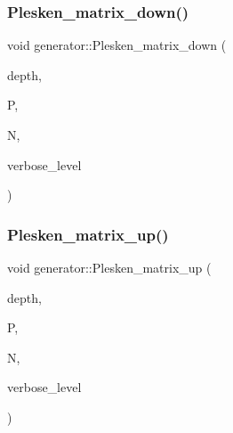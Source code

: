 \subsubsection{\texorpdfstring{Plesken\+\_\+matrix\+\_\+down()}{Plesken\_matrix\_down()}}
{\footnotesize\ttfamily void generator\+::\+Plesken\+\_\+matrix\+\_\+down (\begin{DoxyParamCaption}\item[{\mbox{\hyperlink{galois_8h_a09fddde158a3a20bd2dcadb609de11dc}{I\+NT}}}]{depth,  }\item[{\mbox{\hyperlink{galois_8h_a09fddde158a3a20bd2dcadb609de11dc}{I\+NT}} $\ast$\&}]{P,  }\item[{\mbox{\hyperlink{galois_8h_a09fddde158a3a20bd2dcadb609de11dc}{I\+NT}} \&}]{N,  }\item[{\mbox{\hyperlink{galois_8h_a09fddde158a3a20bd2dcadb609de11dc}{I\+NT}}}]{verbose\+\_\+level }\end{DoxyParamCaption})}

\mbox{\label{classgenerator_a5944c65399c201b426ea3ab2eb7cfa6e}} 
\subsubsection{\texorpdfstring{Plesken\+\_\+matrix\+\_\+up()}{Plesken\_matrix\_up()}}
{\footnotesize\ttfamily void generator\+::\+Plesken\+\_\+matrix\+\_\+up (\begin{DoxyParamCaption}\item[{\mbox{\hyperlink{galois_8h_a09fddde158a3a20bd2dcadb609de11dc}{I\+NT}}}]{depth,  }\item[{\mbox{\hyperlink{galois_8h_a09fddde158a3a20bd2dcadb609de11dc}{I\+NT}} $\ast$\&}]{P,  }\item[{\mbox{\hyperlink{galois_8h_a09fddde158a3a20bd2dcadb609de11dc}{I\+NT}} \&}]{N,  }\item[{\mbox{\hyperlink{galois_8h_a09fddde158a3a20bd2dcadb609de11dc}{I\+NT}}}]{verbose\+\_\+level }\end{DoxyParamCaption})}

\mbox{\label{classgenerator_a8671e3798fb19accfa92c41d7389a8eb}} 
